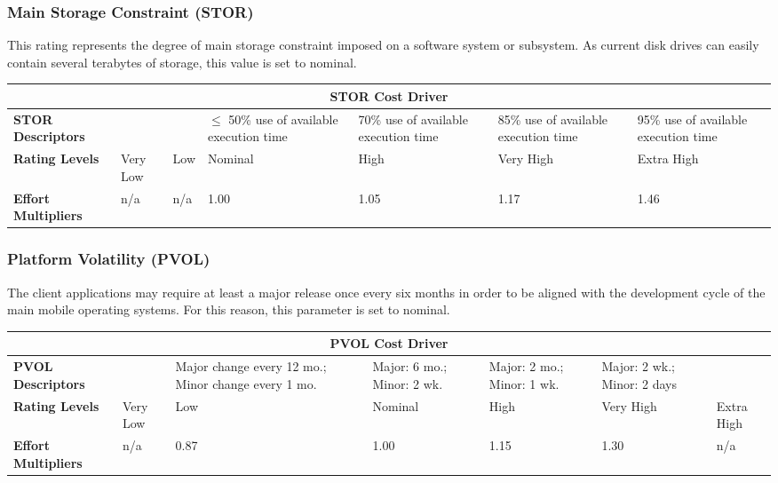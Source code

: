 \subsubsection*{Main Storage Constraint (STOR)}
This rating represents the degree of main storage constraint imposed on a software system or subsystem. As current disk drives can easily contain several terabytes of storage, this value is set to nominal.

\begin{table}[H]
	\centering
	\begin{tabular}{| m{1.8cm} | m{0.8cm} | m{0.8cm} | m{1.8cm} | m{1.8cm} | m{1.8cm} | m{1.8cm} | }
		\hline
		\multicolumn{7}{|c|}{ \textbf{STOR Cost Driver} } \\
		\hline
		\hline
		\textbf{STOR Descriptors} & & & \(\leq\) 50\% \newline use of \newline available execution time & 70\% use of available execution time & 85\% use of available execution time & 95\% use of available execution time\\
		\hline
		\textbf{Rating Levels} & Very Low & Low & Nominal & High & Very High & Extra High \\
		\hline
		\textbf{Effort Multipliers} & n/a & n/a & 1.00 & 1.05 & 1.17 & 1.46 \\ 
		\hline
	\end{tabular}
\end{table} 

\subsubsection*{Platform Volatility (PVOL)}
The client applications may require at least a major release once every six months in order to be aligned with the development cycle of the main mobile operating systems. For this reason, this parameter is set to nominal.

\begin{table}[H]
	\centering
	\begin{tabular}{| m{1.8cm} | m{0.8cm} | m{2.5cm} | m{1.5cm} | m{1.5cm} | m{1.5cm} | m{0.9cm} | }
		\hline
		\multicolumn{7}{|c|}{ \textbf{PVOL Cost Driver} } \\
		\hline
		\hline
		\textbf{PVOL Descriptors} & & Major change every 12 mo.; Minor change every 1 mo. & Major: 6 mo.; Minor: 2 wk. & Major: 2 mo.; Minor: 1 wk. & Major: 2 wk.; Minor: 2 days & \\
		\hline
		\textbf{Rating Levels} & Very Low & Low & Nominal & High & Very High & Extra High \\
		\hline
		\textbf{Effort Multipliers} & n/a & 0.87 & 1.00 & 1.15 & 1.30 & n/a \\ 
		\hline
	\end{tabular}
\end{table}

